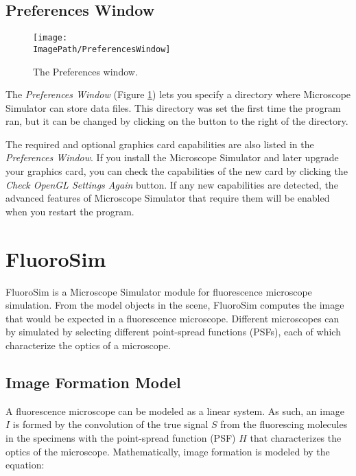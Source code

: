 \documentclass[11pt,titlepage,twoside]{article}
\begin{document}
\subsection{Preferences Window}
\label{sec:PreferencesWindow}

\begin{figure}[htbp] %
   \centering
   \texttt{[image: \\ImagePath/PreferencesWindow]} 
   \caption{The Preferences window.}
   \label{fig:PreferencesWindow}
\end{figure}

The \emph{Preferences Window} (Figure \ref{fig:PreferencesWindow}) lets you specify a directory where Microscope Simulator can store data files. This directory was set the first time the program ran, but it can be changed by clicking on the button to the right of the directory.

The required and optional graphics card capabilities are also listed in the \emph{Preferences Window}. If you install the Microscope Simulator and later upgrade your graphics card, you can check the capabilities of the new card by clicking the \emph{Check OpenGL Settings Again} button. If any new capabilities are detected, the advanced features of Microscope Simulator that require them will be enabled when you restart the program.

\section{FluoroSim}
\label{sec:FluoroSim}

FluoroSim is a Microscope Simulator module for fluorescence microscope simulation. From the model objects in the scene, FluoroSim computes the image that would be expected in a fluorescence microscope. Different microscopes can by simulated by selecting different point-spread functions (PSFs), each of which characterize the optics of a microscope.

\subsection{Image Formation Model}

A fluorescence microscope can be modeled as a linear system. As such, an image $I$ is formed by the convolution of the true signal $S$ from the fluorescing molecules in the specimens with the point-spread function (PSF) $H$ that characterizes the optics of the microscope. Mathematically, image formation is modeled by the equation:
\end{document}
